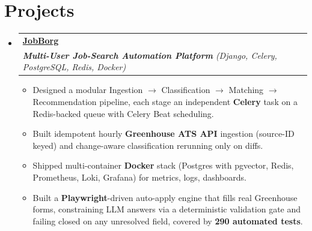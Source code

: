 \documentclass[letterpaper,10pt]{article}
\makeatletter
\newcommand{\resumeItem}[1]{
  \item\small{
    #1 \vspace{-3pt}
  }
}
\newcommand{\resumeSubheading}[4]{
  \item[]
    \begin{tabular*}{0.97\textwidth}{l@{\extracolsep{\fill}}r}
      \textbf{#1} & #2 \\
      \textit{\small#3} & \textit{\small #4} \\
    \end{tabular*}
}
\newcommand{\resumeSubHeadingListStart}{\vspace{-4pt}\begin{itemize}[leftmargin=*,itemsep=5pt,parsep=0pt]}
\newcommand{\resumeSubHeadingListEnd}{\end{itemize}}
\newcommand{\resumeItemListStart}{\vspace{-2pt}\begin{itemize}[leftmargin=8pt,itemsep=1.5pt,parsep=0pt]
  \selectfont\small
  \setlength\itemsep{1.5pt}
  \setlength\parsep{0em}
  }
\newcommand{\resumeItemListEnd}{\end{itemize}}
\makeatother
\begin{document}
\section{Projects}
\resumeSubHeadingListStart
\resumeSubheading
{\href{https://github.com/yash10019coder/JOB-BORG}{JobBorg}}{}
{\textbf{Multi-User Job-Search Automation Platform} (Django, Celery, PostgreSQL, Redis, Docker)}{}
\resumeItemListStart
\resumeItem{Designed a modular Ingestion $\to$ Classification $\to$ Matching $\to$ Recommendation pipeline, each stage an independent \textbf{Celery} task on a Redis-backed queue with Celery Beat scheduling.}
\resumeItem{Built idempotent hourly \textbf{Greenhouse ATS API} ingestion (source-ID keyed) and change-aware classification rerunning only on diffs.}
\resumeItem{Shipped multi-container \textbf{Docker} stack (Postgres with pgvector, Redis, Prometheus, Loki, Grafana) for metrics, logs, dashboards.}
\resumeItem{Built a \textbf{Playwright}-driven auto-apply engine that fills real Greenhouse forms, constraining LLM answers via a deterministic validation gate and failing closed on any unresolved field, covered by \textbf{290 automated tests}.}
\resumeItemListEnd
\resumeSubHeadingListEnd
\end{document}
